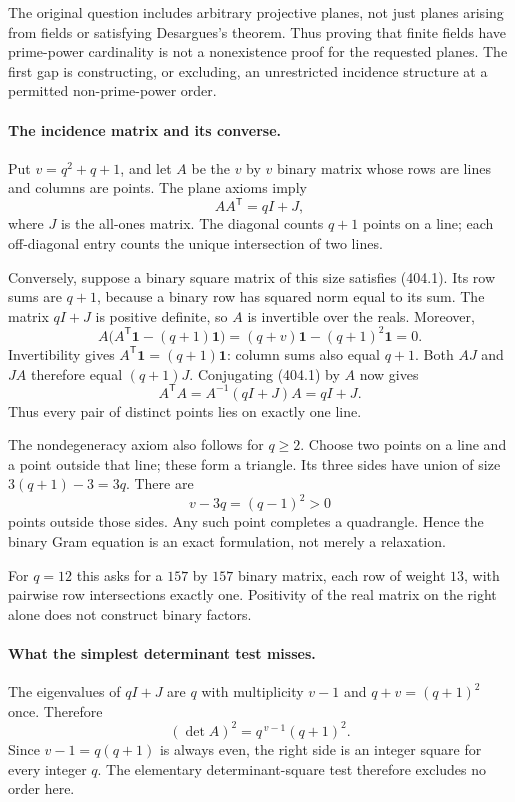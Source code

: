 \documentclass[11pt]{article}
\begin{document}
The original question includes arbitrary projective planes, not just planes arising from fields or satisfying Desargues's theorem. Thus proving that finite fields have prime-power cardinality is not a nonexistence proof for the requested planes. The first gap is constructing, or excluding, an unrestricted incidence structure at a permitted non-prime-power order.

\paragraph{The incidence matrix and its converse.}
Put $v=q^2+q+1$, and let $A$ be the $v$ by $v$ binary matrix whose rows are lines and columns are points. The plane axioms imply
\[
 AA^{\mathsf T}=qI+J,
 \tag{404.1}
\]
where $J$ is the all-ones matrix. The diagonal counts $q+1$ points on a line; each off-diagonal entry counts the unique intersection of two lines.

Conversely, suppose a binary square matrix of this size satisfies (404.1). Its row sums are $q+1$, because a binary row has squared norm equal to its sum. The matrix $qI+J$ is positive definite, so $A$ is invertible over the reals. Moreover,
\[
 A\bigl(A^{\mathsf T}\mathbf1-(q+1)\mathbf1\bigr)
 =(q+v)\mathbf1-(q+1)^2\mathbf1=0.
\]
Invertibility gives $A^{\mathsf T}\mathbf1=(q+1)\mathbf1$: column sums also equal $q+1$. Both $AJ$ and $JA$ therefore equal $(q+1)J$. Conjugating (404.1) by $A$ now gives
\[
 A^{\mathsf T}A=A^{-1}(qI+J)A=qI+J.
\]
Thus every pair of distinct points lies on exactly one line.

The nondegeneracy axiom also follows for $q\ge2$. Choose two points on a line and a point outside that line; these form a triangle. Its three sides have union of size $3(q+1)-3=3q$. There are
\[
 v-3q=(q-1)^2>0
\]
points outside those sides. Any such point completes a quadrangle. Hence the binary Gram equation is an exact formulation, not merely a relaxation.

For $q=12$ this asks for a $157$ by $157$ binary matrix, each row of weight $13$, with pairwise row intersections exactly one. Positivity of the real matrix on the right alone does not construct binary factors.

\paragraph{What the simplest determinant test misses.}
The eigenvalues of $qI+J$ are $q$ with multiplicity $v-1$ and $q+v=(q+1)^2$ once. Therefore
\[
 (\det A)^2=q^{\,v-1}(q+1)^2.
 \tag{404.2}
\]
Since $v-1=q(q+1)$ is always even, the right side is an integer square for every integer $q$. The elementary determinant-square test therefore excludes no order here.
\end{document}
